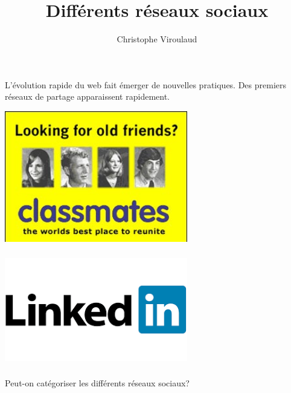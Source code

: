 \documentclass[svgnames,11pt]{beamer}
\author[]{Christophe Viroulaud}
\title{Différents réseaux sociaux}
\date{\framebox{\textbf{ResSoc 01}}}
\institute{Seconde - SNT}
\begin{document}
\begin{frame}
\titlepage
\end{frame}
\begin{frame}
    \frametitle{}
    L’évolution rapide du web fait émerger de nouvelles pratiques. Des premiers réseaux de partage
    apparaissent rapidement.
    \begin{center}
    \centering
    \includegraphics[width=8cm]{ressources/classmates.jpg}
    \label{IMG}
    \end{center}  

\end{frame}
\begin{frame}
    \frametitle{}

    \begin{center}
    \centering
    \includegraphics[width=8cm]{ressources/linkedin.png}
    \label{IMG}
    \end{center}

\end{frame}
\begin{frame}
    \frametitle{}

    \begin{framed}
        Peut-on catégoriser les différents réseaux sociaux?
    \end{framed}

\end{frame}
\end{document}
